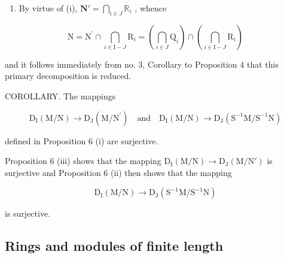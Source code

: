 \begin{enumerate}
  As \(S^{-1}N' = S^{-1}N\) , we may replace N by \(N'\) , that is suppose that J = I. Let \((P_i)_{i \in I}\) be a reduced primary decomposition of \(S^{-1}N\) in \(S^{-1}M\) and let us write \(Q_i = (i_M^S)^{-1}(P_i)\) ; it follows from no. 1, Proposition 3 that \(Q_i\) is primary for \(p_i (i \in I)\) and \((Q_i)_{i \in I}\) is then a reduced primary decomposition of N in M by virtue of no. 3, Corollary to Proposition 4. Finally, as, for all \(i \in I\) and every submodule \(Q'_i\) of which M is \(p_i\) -primary with respect to M, \(Q'_i = (i_M^S)^{-1}(S^{-1}Q'_i)\) by virtue of no. 1, Proposition 3 and the hypothesis J = I, we see that two mappings \(D_I(M/N) \to D_I(S^{-1}M/S^{-1}N)\) and \(D_I(S^{-1}M/S^{-1}N) \to D_I(M/N)\) have been defined whose compositions are the identities on \(D_I(M/N)\) and \(D_I(S^{-1}M/S^{-1}N)\) , which proves (ii).
\item
  By virtue of (i), \(\mathbf{N}' = \bigcap_{i\in J}\mathbb{R}_i\) , whence
\end{enumerate}

\[
\mathrm{N} = \mathrm{N} ^ {\prime} \cap \bigcap_ {i \in \mathrm{I} - J} \mathrm{R} _ {i} = \left(\bigcap_ {i \in J} \mathrm{Q} _ {i}\right) \cap \left(\bigcap_ {i \in \mathrm{I} - J} \mathrm{R} _ {i}\right)
\]

and it follows immediately from no. 3, Corollary to Proposition 4 that this primary decomposition is reduced.

COROLLARY. The mappings

\[
\mathrm{D} _ {\mathrm{I}} (\mathrm{M} / \mathrm{N}) \rightarrow \mathrm{D} _ {\mathrm{J}} (\mathrm{M} / \mathrm{N} ^ {\prime}) \quad \text{and} \quad \mathrm{D} _ {\mathrm{I}} (\mathrm{M} / \mathrm{N}) \rightarrow \mathrm{D} _ {\mathrm{J}} (\mathrm{S} ^ {- 1} \mathrm{M} / \mathrm{S} ^ {- 1} \mathrm{N})
\]

defined in Proposition 6 (i) are surjective.

Proposition 6 (iii) shows that the mapping \(\mathrm{D}_{\mathrm{I}}(\mathrm{M}/\mathrm{N}) \rightarrow \mathrm{D}_{\mathrm{J}}(\mathrm{M}/\mathrm{N}')\) is surjective and Proposition 6 (ii) then shows that the mapping

\[
\mathrm{D} _ {\mathrm{I}} (\mathrm{M} / \mathrm{N}) \rightarrow \mathrm{D} _ {\mathrm{J}} (\mathrm{S} ^ {- 1} \mathrm{M} / \mathrm{S} ^ {- 1} \mathrm{N})
\]

is surjective.

\subsection{Rings and modules of finite length}

